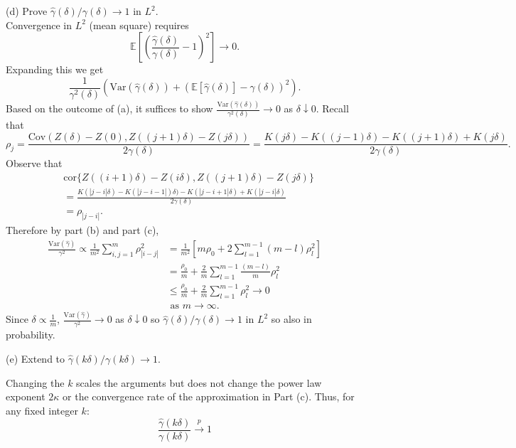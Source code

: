 \documentclass{article}
\begin{document}
\noindent
(d) Prove $\hat{\gamma}(\delta)/\gamma(\delta) \to 1$ in $L^2$.\\
Convergence in $L^2$ (mean square) requires $$\mathbb{E}\left[ \left( \frac{\hat{\gamma}(\delta)}{\gamma(\delta)} - 1 \right)^2 \right] \to 0.$$ 
Expanding this we get $$\frac{1}{\gamma^2(\delta)} \left( \text{Var}(\hat{\gamma}(\delta)) + (\mathbb{E}[\hat{\gamma}(\delta)] - \gamma(\delta))^2 \right).$$
Based on the outcome of (a), it suffices to show $\frac{\text{Var}(\hat{\gamma}(\delta))}{\gamma^2(\delta)} \to 0$ as $\delta\downarrow 0$. 
Recall that $$\rho_{j}=\frac{\text{Cov}(Z(\delta) - Z(0), Z((j+1)\delta) - Z(j\delta))}{2\gamma(\delta)}=\frac{K(j\delta)-K((j-1)\delta)-K((j+1)\delta)+K(j\delta)}{2\gamma(\delta)}.$$
Observe that
\begin{align*}
&\text{cor}\{Z((i+1)\delta)-Z(i\delta), Z((j+1)\delta)-Z(j\delta)\}\\
&=\frac{K(|j-i|\delta)-K(|j-i-1|)\delta)-K(|j-i+1|\delta)+K(|j-i|\delta)}{2\gamma(\delta)}\\
&=\rho_{|j-i|}.
\end{align*}
Therefore by part (b) and part (c), 
\begin{align*}
    \frac{\text{Var}(\hat{\gamma})}{\gamma^2} \propto \frac{1}{m^2} \sum_{i,j=1}^{m} \rho_{|i-j|}^2 &= \frac{1}{m^2} [m\rho_{0}+ 2\sum_{l=1}^{m-1} (m-l)\rho_l^2] \\
    &= \frac{\rho_{0}}{m}+ \frac{2}{m}\sum_{l=1}^{m-1} \frac{(m-l)}{m}\rho_l^2 \\
    &\leq \frac{\rho_{0}}{m}+ \frac{2}{m}\sum_{l=1}^{m-1} \rho_l^2 \to 0 \\
    &\text{ as $m \to \infty$. }
\end{align*}
Since $\delta \propto \frac{1}{m}$, $\frac{\text{Var}(\hat{\gamma})}{\gamma^2}\to 0$ as $\delta\downarrow 0$ so
$\hat{\gamma}(\delta)/\gamma(\delta) \to 1$ in $L^2$ so also in probability.
\medskip

\noindent
(e) Extend to $\hat{\gamma}(k\delta)/\gamma(k\delta) \to 1$.

Changing the $k$ scales the arguments but does not change the power law exponent $2\kappa$ or the convergence rate of the approximation in Part (c). Thus, for any fixed integer $k$: $$\frac{\hat{\gamma}(k\delta)}{\gamma(k\delta)} \xrightarrow{p} 1$$

\medskip
\end{document}
